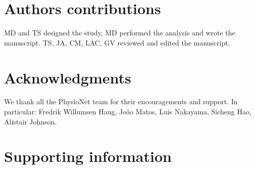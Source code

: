 \documentclass[10pt,letterpaper]{article}
\begin{document}
\section*{Authors contributions}

MD and TS designed the study, MD performed the analysis and wrote the manuscript.
TS, JA, CM, LAC, GV reviewed and edited the manuscript.

\section*{Acknowledgments}

We thank all the PhysioNet team for their encouragements and support. In
particular: Fredrik Willumsen Haug, João Matos, Luis Nakayama, Sicheng Hao, Alistair Johnson.

\nolinenumbers



\clearpage

\section*{Supporting information}

\end{document}
